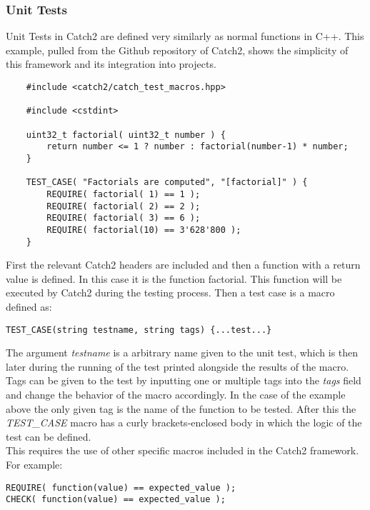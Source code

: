 \subsubsection{Unit Tests}

Unit Tests in Catch2 are defined very similarly as normal functions in C++. This example, pulled from the Github repository of Catch2, shows the simplicity of
this framework and its integration into projects.

\begin{verbatim}
    #include <catch2/catch_test_macros.hpp>

    #include <cstdint>
    
    uint32_t factorial( uint32_t number ) {
        return number <= 1 ? number : factorial(number-1) * number;
    }
    
    TEST_CASE( "Factorials are computed", "[factorial]" ) {
        REQUIRE( factorial( 1) == 1 );
        REQUIRE( factorial( 2) == 2 );
        REQUIRE( factorial( 3) == 6 );
        REQUIRE( factorial(10) == 3'628'800 );
    }
\end{verbatim}

First the relevant Catch2 headers are included and then a function with a return value is defined. In this case it is the function factorial. 
This function will be executed by Catch2 during the testing process. Then a test case is a macro defined as:

\begin{verbatim}
TEST_CASE(string testname, string tags) {...test...}
\end{verbatim}

The argument \textit{testname} is a arbitrary name given to the unit test, which is then later during the running of the test printed alongside the results of the macro.
Tags can be given to the test by inputting one or multiple tags into the \textit{tags} field and change the behavior of the macro accordingly. In the case of the example above
the only given tag is the name of the function to be tested. After this the \textit{TEST\_CASE} macro has a curly brackets-enclosed body in which the logic of the test can 
be defined.\\
This requires the use of other specific macros included in the Catch2 framework. For example:

\begin{verbatim}
REQUIRE( function(value) == expected_value );
CHECK( function(value) == expected_value );
\end{verbatim}

